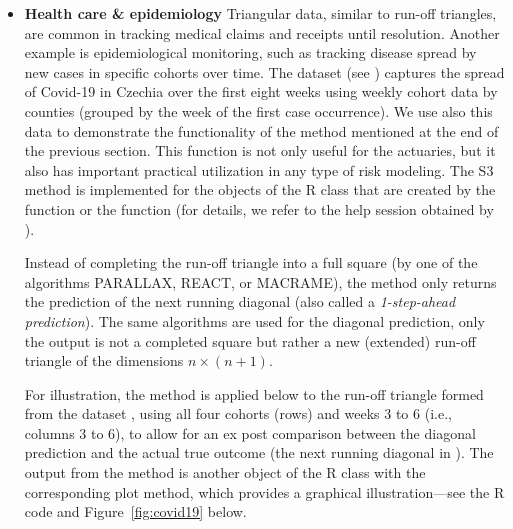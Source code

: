 \begin{itemize}[topsep=0pt, partopsep=0pt, itemsep=0pt, parsep=0pt, labelindent=0pt, leftmargin=10pt]
    \item \textbf{Health care \& epidemiology} 
    Triangular data, similar to run-off triangles, are common in tracking medical claims and receipts until resolution. Another example is epidemiological monitoring, such as tracking disease spread by new cases in specific cohorts over time. The dataset  (see ) captures the spread of Covid-19 in Czechia over the first eight weeks using weekly cohort data by counties (grouped by the week of the first case occurrence). We use also this data to demonstrate the functionality of the  method mentioned at the end of the previous section. This function is not only useful for the actuaries, but it also has important practical utilization in any type of risk modeling. The S3 method  is implemented for the objects of the R class  that are created by the  function or the  function (for details, we refer to the help session obtained by ).

    Instead of completing the run-off triangle into a full square (by one of the algorithms PARALLAX, REACT, or MACRAME), the  method only returns the prediction of the next running diagonal (also called a \emph{1-step-ahead prediction}). The same algorithms are used for the diagonal prediction, only the output is not a completed square but rather a new (extended) run-off triangle of the dimensions $n \times (n + 1)$.

    For illustration, the  method is applied below to the run-off triangle formed from the dataset , using all four cohorts (rows) and weeks 3 to 6 (i.e., columns 3 to 6), to allow for an ex post comparison between the diagonal prediction and the actual true outcome (the next running diagonal in ).
        The output from the  method is another object of the R class  with the corresponding plot method, which provides a graphical illustration---see the R code and Figure~\ref{fig:covid19} below.

\begin{figure}[htbp]
\centering
\hspace*{0.5cm}
\begin{minipage}{0.6\textwidth}
\small 
\begin{Verbatim}[commandchars=\\\{\}]


\end{Verbatim}
\end{minipage}
\end{figure}
\end{itemize}
